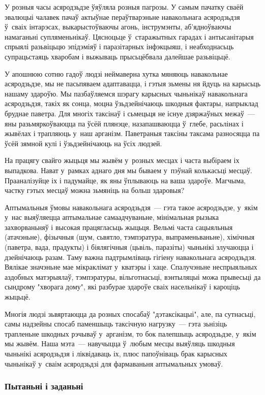 У розныя часы асяродзьдзе ўяўляла розныя пагрозы. У самым пачатку сваёй эвалюцыі чалавек пачаў актыўнае пераўтварэньне навакольнага асяродзьдзя ў~сваіх інтарэсах, выкарыстоўваючы агонь, інструмэнты, аб'ядноўваючы намаганьні супляменьнікаў. Цясноцьце ў~старажытных гарадах і антысанітарыя спрыялі разьвіцьцю эпідэміяў і паразітарных інфэкцыяш, і неабходнасьць супрацьстаяць хваробам і выжываць прысьцёбвала далейшае разьвіцьцё.

У апошнюю сотню гадоў людзі неймаверна хутка мяняюць навакольнае асяродзьдзе, мы не пасьпяваем адаптавацца, і гэтыя зьмены ня йдуць на карысьць нашаму здароўю. Мы пазбаўляемся шэрагу карысных чыньнікаў навакольнага асяродзьдзя, такіх як сонца, моцна ўзьдзейнічаюць шкодныя фактары, напрыклад бруднае паветра. Для многіх таксінаў і сьмецьця не існуе дзяржаўных межаў~--- яны разьмяркоўваюцца па ўсёй плянэце, назапашваюцца ў~глебе, расьлінах і жывёлах і трапляюць у~наш арганізм. Паветраныя таксіны таксама разносяцца па ўсёй зямной кулі і ўзьдзейнічаюць на ўсіх людзей.

На працягу свайго жыцьця мы жывём у~розных месцах і часта выбіраем іх выпадкова. Нават у~рамках аднаго дня мы бываем у~пэўнай колькасьці месцаў. Прааналізуйце іх і падумайце, як яны ўплываюць на ваша здароўе. Магчыма, частку гэтых месцаў можна зьмяніць на больш здаровыя?

Аптымальныя ўмовы навакольнага асяродзьдзя~--- гэта такое асяродзьдзе, у~якім у~нас выяўляецца аптымальнае самаадчуваньне, мінімальная рызыка захворваньняў і высокая працягласьць жыцьця. Вельмі часта сацыяльныя (атачэньне), фізычныя (шум, сьвятло, тэмпэратура, выпраменьваньне), хімічныя (паветра, вада, прадукты) і біялягічныя (цьвіль, паразіты) чыньнікі злучаюцца і дзейнічаюць разам. Таму важна падтрымліваць гігіену навакольнага асяродзьдзя. Вялікае значэньне мае мікраклімат у~кватэры і хаце. Спалучэньне неспрыяльных аздобных матэрыялаў, тэмпэратуры, вільготнасьці, вэнтыляцыі можа прывесьці да сындрому "хворага дому", які разбурае здароўе сваіх насельнікаў і кароціць жыцьцё.

Многія людзі зьвяртаюцца да розных спосабаў "дэтаксікацыі", але, па сутнасьці, самы надзейны спосаб паменшыць таксічную нагрузку~--- гэта зьнізіць трапленьне шкодных рэчываў у~арганізм, то бок палепшыць асяродзьдзе, у~якім мы жывём. Наша мэта~--- навучыцца ў~любым месцы выяўляць шкодныя чыньнікі асяродзьдзя і ліквідаваць іх, плюс папоўніваць брак карысных чыньнікаў у~сваім асяродзьдзі для фармаваньня аптымальных умоваў.

\subsubsection{Пытаньні і заданьні}

